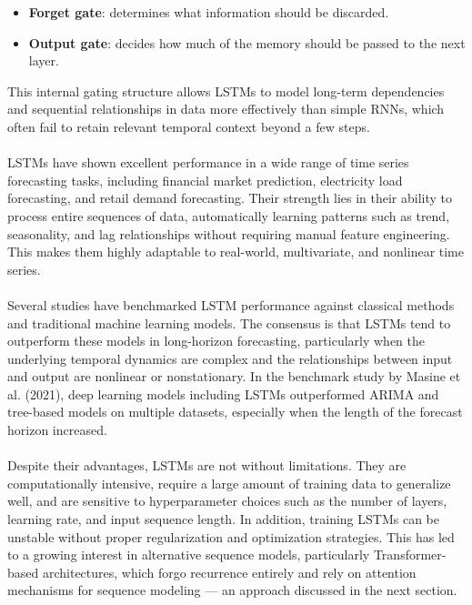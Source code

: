 \documentclass{article}
\begin{document}
\begin{itemize}
    \item \textbf{Forget gate}: determines what information should be discarded.
\end{itemize}

\begin{itemize}
    \item \textbf{Output gate}: decides how much of the memory should be passed to the next layer.
\end{itemize}

This internal gating structure allows LSTMs to model long-term dependencies and sequential relationships in data more effectively than simple RNNs, which often fail to retain relevant temporal context beyond a few steps. \cite{garg2022machine}\\
\\
LSTMs have shown excellent performance in a wide range of time series forecasting tasks, including financial market prediction, electricity load forecasting, and retail demand forecasting. Their strength lies in their ability to process entire sequences of data, automatically learning patterns such as trend, seasonality, and lag relationships without requiring manual feature engineering. This makes them highly adaptable to real-world, multivariate, and nonlinear time series. \cite{garg2022machine}\\
\\
Several studies have benchmarked LSTM performance against classical methods and traditional machine learning models. The consensus is that LSTMs tend to outperform these models in long-horizon forecasting, particularly when the underlying temporal dynamics are complex and the relationships between input and output are nonlinear or nonstationary. In the benchmark study by Masine et al. (2021), deep learning models including LSTMs outperformed ARIMA and tree-based models on multiple datasets, especially when the length of the forecast horizon increased.\\
\\
Despite their advantages, LSTMs are not without limitations. They are computationally intensive, require a large amount of training data to generalize well, and are sensitive to hyperparameter choices such as the number of layers, learning rate, and input sequence length. In addition, training LSTMs can be unstable without proper regularization and optimization strategies. This has led to a growing interest in alternative sequence models, particularly Transformer-based architectures, which forgo recurrence entirely and rely on attention mechanisms for sequence modeling — an approach discussed in the next section.\\
\end{document}
